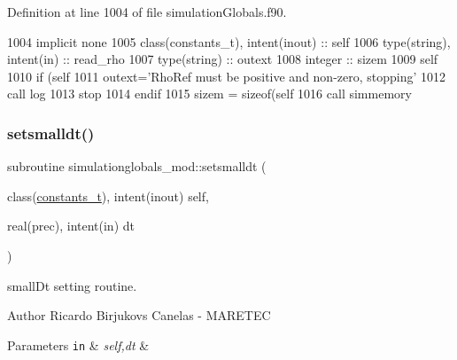 Definition at line 1004 of file simulation\+Globals.\+f90.


\begin{DoxyCode}
1004     \textcolor{keywordtype}{implicit none}
1005     \textcolor{keywordtype}{class}(constants\_t), \textcolor{keywordtype}{intent(inout)} :: self
1006     \textcolor{keywordtype}{type}(string), \textcolor{keywordtype}{intent(in)} :: read\_rho
1007     \textcolor{keywordtype}{type}(string) :: outext
1008     \textcolor{keywordtype}{integer} :: sizem
1009     self%
1010     \textcolor{keywordflow}{if} (self%
1011         outext=\textcolor{stringliteral}{'RhoRef must be positive and non-zero, stopping'}
1012         \textcolor{keyword}{call }log%
1013         stop
1014 \textcolor{keywordflow}{    endif}
1015     sizem = sizeof(self%
1016     \textcolor{keyword}{call }simmemory%
\end{DoxyCode}
\mbox{\label{namespacesimulationglobals__mod_ad36c21a592a3230ce848804075abc97e}} 
\subsubsection{\texorpdfstring{setsmalldt()}{setsmalldt()}}
{\footnotesize\ttfamily subroutine simulationglobals\+\_\+mod\+::setsmalldt (\begin{DoxyParamCaption}\item[{class(\mbox{\hyperlink{structsimulationglobals__mod_1_1constants__t}{constants\+\_\+t}}), intent(inout)}]{self,  }\item[{real(prec), intent(in)}]{dt }\end{DoxyParamCaption})\hspace{0.3cm}{\ttfamily [private]}}



small\+Dt setting routine. 

\begin{DoxyAuthor}{Author}
Ricardo Birjukovs Canelas -\/ M\+A\+R\+E\+T\+EC 
\end{DoxyAuthor}

\begin{DoxyParams}[1]{Parameters}
\mbox{\tt in}  & {\em self,dt} & \\
\hline
\end{DoxyParams}


